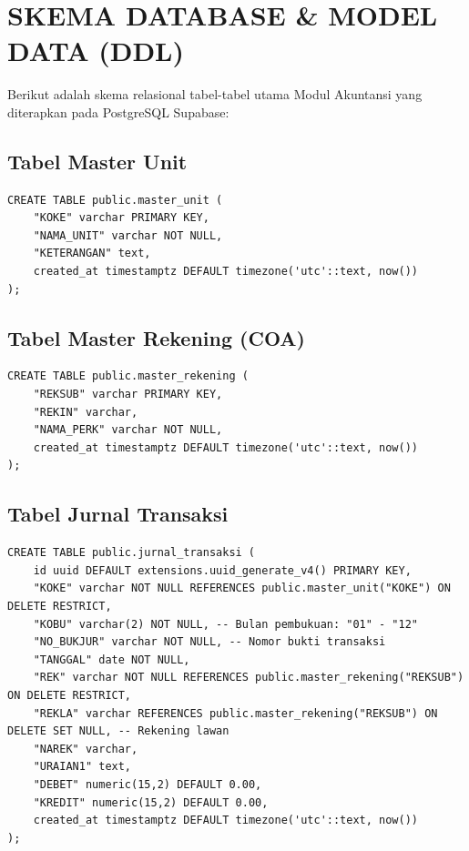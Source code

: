 \documentclass[11pt,a4paper]{article}
\begin{document}
\newpage

\section{SKEMA DATABASE \& MODEL DATA (DDL)}

Berikut adalah skema relasional tabel-tabel utama Modul Akuntansi yang diterapkan pada PostgreSQL Supabase:

\subsection{Tabel Master Unit}
\begin{lstlisting}[caption={DDL Master Unit}]
CREATE TABLE public.master_unit (
    "KOKE" varchar PRIMARY KEY,
    "NAMA_UNIT" varchar NOT NULL,
    "KETERANGAN" text,
    created_at timestamptz DEFAULT timezone('utc'::text, now())
);
\end{lstlisting}

\subsection{Tabel Master Rekening (COA)}
\begin{lstlisting}[caption={DDL Master Rekening (COA)}]
CREATE TABLE public.master_rekening (
    "REKSUB" varchar PRIMARY KEY,
    "REKIN" varchar,
    "NAMA_PERK" varchar NOT NULL,
    created_at timestamptz DEFAULT timezone('utc'::text, now())
);
\end{lstlisting}

\subsection{Tabel Jurnal Transaksi}
\begin{lstlisting}[caption={DDL Jurnal Transaksi}]
CREATE TABLE public.jurnal_transaksi (
    id uuid DEFAULT extensions.uuid_generate_v4() PRIMARY KEY,
    "KOKE" varchar NOT NULL REFERENCES public.master_unit("KOKE") ON DELETE RESTRICT,
    "KOBU" varchar(2) NOT NULL, -- Bulan pembukuan: "01" - "12"
    "NO_BUKJUR" varchar NOT NULL, -- Nomor bukti transaksi
    "TANGGAL" date NOT NULL,
    "REK" varchar NOT NULL REFERENCES public.master_rekening("REKSUB") ON DELETE RESTRICT,
    "REKLA" varchar REFERENCES public.master_rekening("REKSUB") ON DELETE SET NULL, -- Rekening lawan
    "NAREK" varchar,
    "URAIAN1" text,
    "DEBET" numeric(15,2) DEFAULT 0.00,
    "KREDIT" numeric(15,2) DEFAULT 0.00,
    created_at timestamptz DEFAULT timezone('utc'::text, now())
);
\end{lstlisting}
\end{document}
